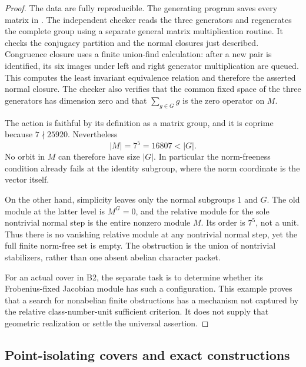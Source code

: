 \documentclass[11pt,a4paper]{article}
\begin{document}
\begin{proof}
The data are fully reproducible. The generating program saves
every matrix in
. The independent
checker  reads
the three generators and regenerates the complete group using
a separate general matrix multiplication routine. It checks
the conjugacy partition and the normal closures just described.
Congruence closure uses a finite union-find calculation: after
a new pair is identified, its six images under left and right
generator multiplication are queued. This computes the least
invariant equivalence relation and therefore the asserted
normal closure. The checker also verifies that the common
fixed space of the three generators has dimension zero and
that $\sum_{g\in G}g$ is the zero operator on $M$.

The action is faithful by its definition as a matrix group,
and it is coprime because $7\nmid25920$. Nevertheless
\[
                         |M|=7^5=16807<|G|.
\]
No orbit in $M$ can therefore have size $|G|$. In particular
the norm-freeness condition already fails at the identity
subgroup, where the norm coordinate is the vector itself.

On the other hand, simplicity leaves only the normal
subgroups $1$ and $G$. The old module at the latter level is
$M^G=0$, and the relative module for the sole nontrivial
normal step is the entire nonzero module $M$. Its order is
$7^5$, not a unit. Thus there is no vanishing relative module
at any nontrivial normal step, yet the full finite norm-free
set is empty. The obstruction is the union of nontrivial
stabilizers, rather than one absent abelian character packet.

For an actual cover in B2, the separate task is to determine
whether its Frobenius-fixed Jacobian module has such a
configuration. This example proves that a search for
nonabelian finite obstructions has a mechanism not captured
by the relative class-number-unit sufficient criterion. It
does not supply that geometric realization or settle the
universal assertion.
\end{proof}


\subsection{Point-isolating covers and exact constructions}
\end{document}
